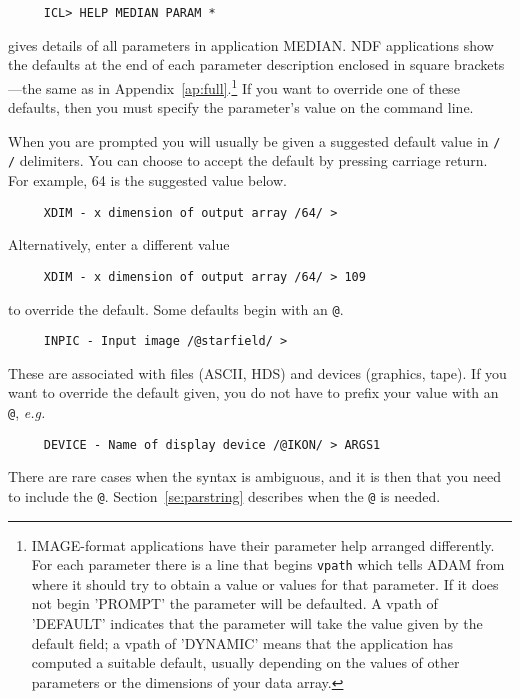\small
\begin{verbatim}
     ICL> HELP MEDIAN PARAM *
\end{verbatim}
\normalsize
gives details of all parameters in application MEDIAN. NDF applications
show the defaults at the end of each parameter description enclosed in
square brackets---the same as in Appendix~\ref{ap:full}.\footnote{
IMAGE-format applications have their parameter help arranged
differently. For each parameter there is a line that begins {\tt vpath}
which tells ADAM from where it should try to obtain a value or values
for that parameter. If it does not begin 'PROMPT' the parameter will be
defaulted.  A vpath of 'DEFAULT' indicates that the parameter will take
the value given by the default field; a vpath of 'DYNAMIC' means that
the application has computed a suitable default, usually depending on
the values of other parameters or the dimensions of your data array.} If
you want to override one of these defaults, then you must specify the
parameter's value on the command line.

When you are prompted you will usually be given a suggested default value in
{\tt / /} delimiters.  You can choose to accept the default by pressing
carriage return.  For example, 64 is the suggested value below.

\small
\begin{verbatim}
     XDIM - x dimension of output array /64/ >
\end{verbatim}
\normalsize
Alternatively, enter a different value

\small
\begin{verbatim}
     XDIM - x dimension of output array /64/ > 109
\end{verbatim}
\normalsize
to override the default.
Some defaults begin with an {\tt @}.

\small
\begin{verbatim}
     INPIC - Input image /@starfield/ >
\end{verbatim}
\normalsize
These are associated with files (ASCII, HDS) and devices (graphics,
tape). If you want to override the default given, you do not have to
prefix your value with an {\tt @}, {\it e.g.}

\small
\begin{verbatim}
     DEVICE - Name of display device /@IKON/ > ARGS1
\end{verbatim}
\normalsize
There are rare cases when the syntax is ambiguous, and it is then that you
need to include the {\tt @}.  Section~\ref{se:parstring} describes
when the {\tt @} is needed.

